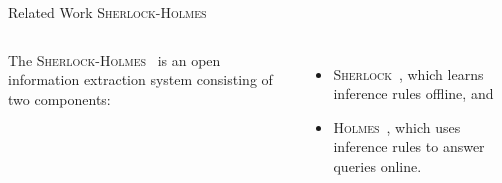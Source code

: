 \documentclass[onlymath,xcolor=pdftex,dvipsnames,table]{beamer}
\newcommand{\sherlock}{\textsc{Sherlock}\xspace}
\newcommand{\holmes}{\textsc{Holmes}\xspace}
\newcommand{\nell}{\textsc{Nell}\xspace}
\newcommand{\head}[1]{{\large\color{OliveGreen}#1\\[2pt]}}
\begin{document}


\begin{frame}{Related Work}
\head{\sherlock-\holmes}
\begin{columns}[c]
  The \sherlock-\holmes~\cite{schoenmackers2011inference} is an open information extraction system consisting of two components:
  \begin{itemize}
    \item \sherlock~\cite{schoenmackers2010learning}, which learns inference rules offline, and
    \item \holmes~\cite{schoenmackers2008scaling}, which uses inference rules to answer queries online.
  \end{itemize}


\end{columns}
\end{frame}
\end{document}
